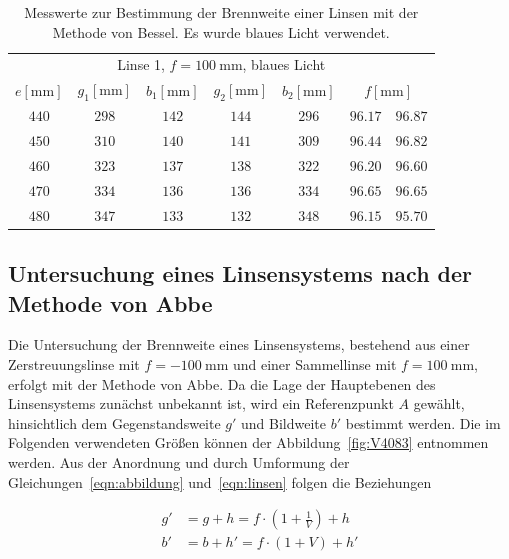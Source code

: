 \documentclass[
  parskip=half,
  bibliography=totoc,     %
  captions=tableheading,  %
  titlepage=firstiscover, %
]{scrartcl}
\begin{document}
\begin{table}[htp]
	\begin{center}
	\caption{Messwerte zur Bestimmung der Brennweite einer Linsen mit der Methode von Bessel. Es wurde blaues Licht verwendet.}
	\label{tab:blau}
		\begin{tabular}{ccccccc}
			\toprule
			\multicolumn{7}{c}{Linse 1, $f=\SI{100}{\milli\metre}$, blaues Licht}\\
			{$e[\si{\milli\metre}]$} & {$g_1[\si{\milli\metre}]$} & {$b_1[\si{\milli\metre}]$} & {$g_2[\si{\milli\metre}]$} & {$b_2[\si{\milli\metre}]$} & \multicolumn{2}{c}{$f[\si{\milli\metre}]$}\\
			\midrule
			$440$ & $298$ & $142$ & $144$ & $296$ & $96.17$ & $96.87$\\
			$450$ & $310$ & $140$ & $141$ & $309$ & $96.44$ & $96.82$\\
			$460$ & $323$ & $137$ & $138$ & $322$ & $96.20$ & $96.60$\\
			$470$ & $334$ & $136$ & $136$ & $334$ & $96.65$ & $96.65$\\
			$480$ & $347$ & $133$ & $132$ & $348$ & $96.15$ & $95.70$\\
			\bottomrule
		\end{tabular}
	\end{center}
\end{table}

\newpage
\subsection{Untersuchung eines Linsensystems nach der Methode von Abbe}

Die Untersuchung der Brennweite eines Linsensystems, bestehend aus einer Zerstreuungslinse mit
$f=\SI{-100}{\milli\metre}$ und einer Sammellinse mit $f=\SI{100}{\milli\metre}$, erfolgt mit der
Methode von Abbe. Da die Lage der Hauptebenen des Linsensystems zunächst unbekannt ist, wird ein
Referenzpunkt $A$ gewählt, hinsichtlich dem Gegenstandsweite $g'$ und Bildweite $b'$ bestimmt werden. Die
im Folgenden verwendeten Größen können der Abbildung~\ref{fig:V4083} entnommen werden. Aus der Anordnung
und durch Umformung der Gleichungen~\eqref{eqn:abbildung} und~\eqref{eqn:linsen} folgen die
Beziehungen

\begin{align}
    g'&=g+h=f\cdot\left(1+\frac{1}{V}\right)+h \\
    b'&=b+h'=f\cdot(1+V)+h'
\end{align}
\end{document}
